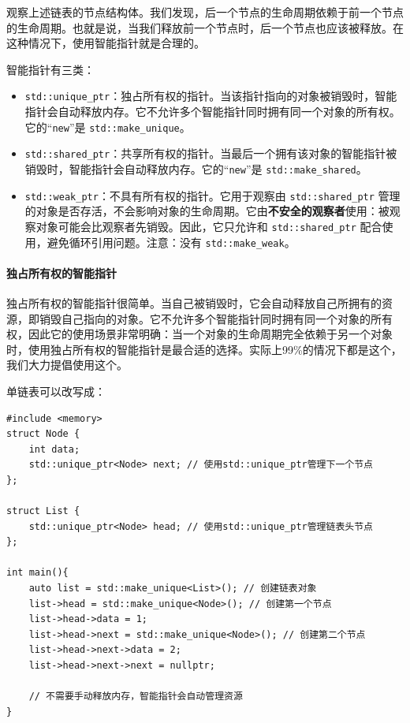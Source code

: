 观察上述链表的节点结构体。我们发现，后一个节点的生命周期依赖于前一个节点的生命周期。也就是说，当我们释放前一个节点时，后一个节点也应该被释放。在这种情况下，使用智能指针就是合理的。

智能指针有三类：
\begin{itemize}
    \item \texttt{std::unique_ptr}：独占所有权的指针。当该指针指向的对象被销毁时，智能指针会自动释放内存。它不允许多个智能指针同时拥有同一个对象的所有权。它的“\verb|new|”是 \texttt{std::make_unique}。
    \item \texttt{std::shared_ptr}：共享所有权的指针。当最后一个拥有该对象的智能指针被销毁时，智能指针会自动释放内存。它的“\verb|new|”是 \texttt{std::make_shared}。
    \item \texttt{std::weak_ptr}：不具有所有权的指针。它用于观察由 \texttt{std::shared_ptr} 管理的对象是否存活，不会影响对象的生命周期。它由\textbf{不安全的观察者}使用：被观察对象可能会比观察者先销毁。因此，它只允许和 \texttt{std::shared_ptr} 配合使用，避免循环引用问题。注意：没有 \texttt{std::make_weak}。
\end{itemize}

\paragraph{独占所有权的智能指针}

独占所有权的智能指针很简单。当自己被销毁时，它会自动释放自己所拥有的资源，即销毁自己指向的对象。它不允许多个智能指针同时拥有同一个对象的所有权，因此它的使用场景非常明确：当一个对象的生命周期完全依赖于另一个对象时，使用独占所有权的智能指针是最合适的选择。实际上99\%的情况下都是这个，我们大力提倡使用这个。

单链表可以改写成：
\begin{verbatim}
#include <memory>
struct Node {
    int data;
    std::unique_ptr<Node> next; // 使用std::unique_ptr管理下一个节点
};

struct List {
    std::unique_ptr<Node> head; // 使用std::unique_ptr管理链表头节点
};

int main(){
    auto list = std::make_unique<List>(); // 创建链表对象
    list->head = std::make_unique<Node>(); // 创建第一个节点
    list->head->data = 1;
    list->head->next = std::make_unique<Node>(); // 创建第二个节点
    list->head->next->data = 2;
    list->head->next->next = nullptr;

    // 不需要手动释放内存，智能指针会自动管理资源
}
\end{verbatim}

